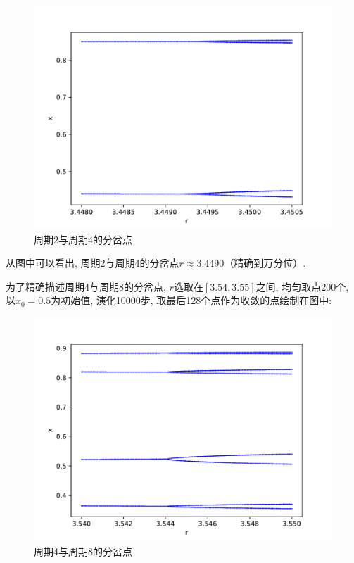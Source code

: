 \documentclass[a4paper,zihao=5,UTF8]{ctexart}
\begin{document}
    \begin{figure}[htbp]
        \centering
        \includegraphics[scale=0.5]{6_2.pdf}
        \caption{周期2与周期4的分岔点}
    \end{figure}
    \par 
    从图中可以看出, 周期2与周期4的分岔点$r\approx 3.4490$（精确到万分位）.
    \par 
    为了精确描述周期4与周期8的分岔点, $r$选取在$[3.54, 3.55]$之间, 均匀取点200个, 以$x_0=0.5$为初始值, 
    演化10000步, 取最后128个点作为收敛的点绘制在图中:
    \begin{figure}[htbp]
        \centering
        \includegraphics[scale=0.5]{6_3.pdf}
        \caption{周期4与周期8的分岔点}
    \end{figure}
\end{document}
